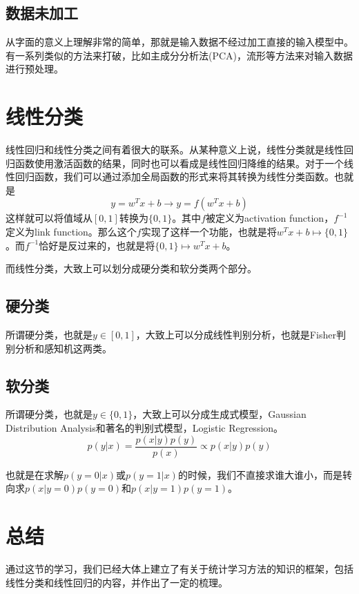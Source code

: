 \documentclass[a4paper]{article}
\begin{document}
\subsection{数据未加工}
从字面的意义上理解非常的简单，那就是输入数据不经过加工直接的输入模型中。有一系列类似的方法来打破，比如主成分分析法(PCA)，流形等方法来对输入数据进行预处理。

\section{线性分类}

线性回归和线性分类之间有着很大的联系。从某种意义上说，线性分类就是线性回归函数使用激活函数的结果，同时也可以看成是线性回归降维的结果。对于一个线性回归函数，我们可以通过添加全局函数的形式来将其转换为线性分类函数。也就是
\begin{equation}
    y=w^Tx+b \longrightarrow y=f(w^Tx+b)
\end{equation}
这样就可以将值域从$[0,1]$转换为$\{0,1\}$。其中$f$被定义为activation function，$f^{-1}$定义为link function。那么这个$f$实现了这样一个功能，也就是将$w^Tx+b \mapsto \{0, 1\}$。而$f^{-1}$恰好是反过来的，也就是将$\{0, 1\} \mapsto w^Tx+b$。

而线性分类，大致上可以划分成硬分类和软分类两个部分。

\subsection{硬分类}
所谓硬分类，也就是$y\in [0,1]$，大致上可以分成线性判别分析，也就是Fisher判别分析和感知机这两类。

\subsection{软分类}
所谓硬分类，也就是$y\in \{0,1\}$，大致上可以分成生成式模型，Gaussian Distribution Analysis和著名的判别式模型，Logistic Regression。
\begin{equation}
    p(y|x)=\frac{p(x|y)p(y)}{p(x)} \propto p(x|y)p(y)
\end{equation}

也就是在求解$p(y=0|x)$或$p(y=1|x)$的时候，我们不直接求谁大谁小，而是转向求$p(x|y=0)p(y=0)$和$p(x|y=1)p(y=1)$。

\section{总结}
通过这节的学习，我们已经大体上建立了有关于统计学习方法的知识的框架，包括线性分类和线性回归的内容，并作出了一定的梳理。
\end{document}
